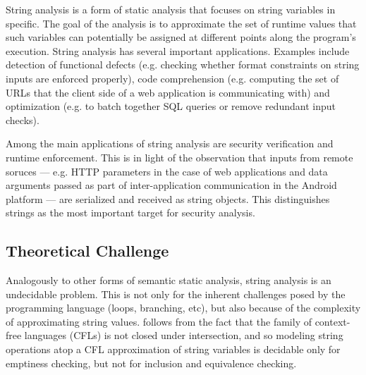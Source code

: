 String analysis is a form of static analysis that focuses on string variables in specific. The goal of the analysis is to approximate the set of runtime values that such variables can potentially be assigned at different points along the program's execution. String analysis has several important applications. Examples include detection of functional defects (e.g. checking whether format constraints on string inputs are enforced properly), code comprehension (e.g. computing the set of URLs that the client side of a web application is communicating with) and optimization (e.g. to batch together SQL queries or remove redundant input checks).

Among the main applications of string analysis are security verification and runtime enforcement. This is in light of the observation that inputs from remote soruces --- e.g. HTTP parameters in the case of web applications and data arguments passed as part of inter-application communication in the Android platform --- are serialized and received as string objects. This distinguishes strings as the most important target for security analysis.

\subsection{Theoretical Challenge}

Analogously to other forms of semantic static analysis, string analysis is an undecidable problem. This is not only for 
the inherent challenges posed by the programming language (loops, branching, etc), but also because of the complexity of approximating string values. 
 follows from the fact that the family of context-free languages (CFLs) is not closed under intersection, and so modeling string operations atop a CFL approximation of string variables is decidable only for emptiness checking, but not for inclusion and equivalence checking.